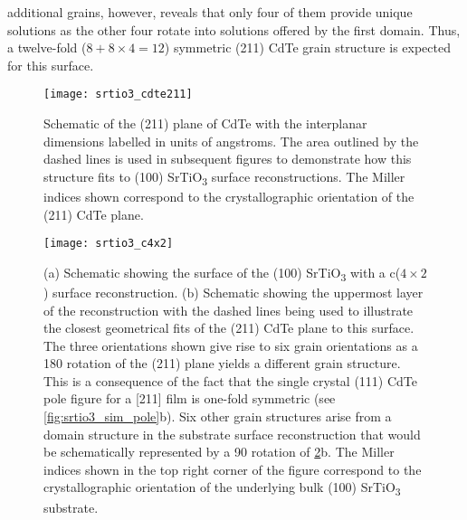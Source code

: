 additional grains, however, reveals that only four of them provide
unique solutions as the other four rotate into solutions offered by
the first domain. Thus, a twelve-fold (\(8 + 8 \times 4 = 12\)) symmetric
(211) CdTe grain structure is expected for this surface.
\begin{figure}
    \centering
    \texttt{[image: srtio3\_cdte211]}
    \caption[Projection of (211) CdTe unit cell on SrTiO\textsubscript{3} surface]{\label{fig:srtio3_cdte211}Schematic of the (211) plane of CdTe with the interplanar dimensions
        labelled in units of angstroms. The area outlined by the dashed lines is used in
        subsequent figures to demonstrate how this structure fits to (100) SrTiO\textsubscript{3} surface
        reconstructions. The Miller indices shown correspond to the crystallographic
        orientation of the (211) CdTe plane.}
\end{figure}
\begin{figure}
    \centering
    \texttt{[image: srtio3\_c4x2]}
    \caption[CdTe on c(4\(\times\)2) SrTiO\textsubscript{3} surface]{\label{fig:srtio3_c4x2}(a) Schematic showing the surface of the (100) SrTiO\textsubscript{3} with a c(\(4\times2\)) surface reconstruction. (b) Schematic showing the uppermost layer of the reconstruction with the dashed lines being used to illustrate the closest geometrical fits of the (211) CdTe plane to this surface. The three orientations shown give rise to six grain orientations as a 180\degree{} rotation of the (211) plane yields a different grain structure. This is a consequence of the fact that the single crystal (111) CdTe pole figure for a [211] film is one-fold symmetric (see \cref{fig:srtio3_sim_pole}b). Six other grain structures arise from a domain structure in the substrate surface reconstruction that would be schematically represented by a 90\degree{} rotation of \cref{fig:srtio3_c4x2}b. The Miller indices shown in the top right corner of the figure correspond to the crystallographic orientation of the underlying bulk (100) SrTiO\textsubscript{3} substrate.}
\end{figure}

